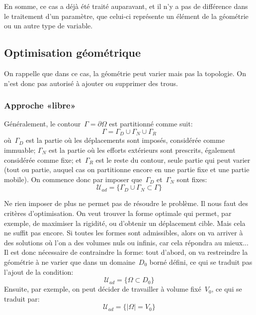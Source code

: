 En somme, ce cas a déjà été traité auparavant, et il n'y a pas de différence dans le traitement d'un paramètre, que celui-ci représente un élément de la géométrie ou un autre type de variable.

\medskip
\subsection{Optimisation géométrique}

On rappelle que dans ce cas, la géométrie peut varier mais pas la topologie. On n'est donc pas autorisé à ajouter ou supprimer des trous.

\medskip
\subsubsection{Approche «libre»}

Généralement, le contour~$\Gamma=\partial\Omega$ est partitionné comme suit:
\begin{equation}
\Gamma = \Gamma_D \cup \Gamma_N \cup \Gamma_R
\end{equation}
où~$\Gamma_D$ est la partie où les déplacements sont imposés, considérée comme immuable; $\Gamma_N$ est la partie où les efforts extérieurs sont prescrits, également considérée comme fixe; et~$\Gamma_R$ est le reste du contour, seule partie qui peut varier (tout ou partie, auquel cas on partitionne encore en une partie fixe et une partie mobile).
On commence donc par imposer que~$\Gamma_D$ et~$\Gamma_N$ sont fixes:
\begin{equation}
\mathcal{U}_{ad}=\{ \Gamma_D \cup \Gamma_N \subset \Gamma\}
\end{equation}

Ne rien imposer de plus ne permet pas de résoudre le problème. Il nous faut des critères d'optimisation.
On veut trouver la forme optimale qui permet, par exemple, de maximiser la rigidité, ou d'obtenir un déplacement cible.
Mais cela ne suffit pas encore. Si toutes les formes sont admissibles, alors on va arriver à des solutions où l'on a des volumes nuls ou infinis, car cela répondra au mieux...
Il est donc nécessaire de contraindre la forme: 
tout d'abord, on va restreindre la géométrie à ne varier que dans un domaine~$D_0$ borné défini, ce qui se traduit pas l'ajout de la condition:
\begin{equation}
\mathcal{U}_{ad}=\{ \Omega\subset D_0 \}
\end{equation}
Ensuite, par exemple, on peut décider de travailler à volume fixé~$V_0$, ce qui se traduit par:
\begin{equation}
\mathcal{U}_{ad}=\{ |\Omega|=V_0\}
\end{equation}

